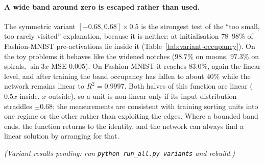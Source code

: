 \documentclass[11pt]{article}
\begin{document}
{\paragraph{A wide band around zero is escaped rather than used.} The symmetric variant
$[-0.68,0.68]\times0.5$ is the strongest test of the ``too small, too rarely visited'' explanation,
because it is neither: at initialisation $78$--$98\%$ of Fashion-MNIST pre-activations lie inside it
(Table~\ref{tab:variant-occupancy}). On the toy problems it behaves like the widened notches
($98.7\%$ on moons, $97.3\%$ on spirals, $\sin 3x$ MSE $0.005$). On Fashion-MNIST it reaches
$83.0\%$, again the linear level, and after training the band occupancy has fallen to about $40\%$
while the network remains linear to $R^2=0.9997$. Both halves of this function are linear ($0.5x$
inside, $x$ outside), so a unit is non-linear only if its input distribution straddles $\pm0.68$; the
measurements are consistent with training sorting units into one regime or the other rather than
exploiting the edges. Where a bounded band ends, the function returns to the identity, and the
network can always find a linear solution by arranging for that.
}{\emph{(Variant results pending: run \texttt{python run\_all.py variants} and rebuild.)}}
\end{document}
